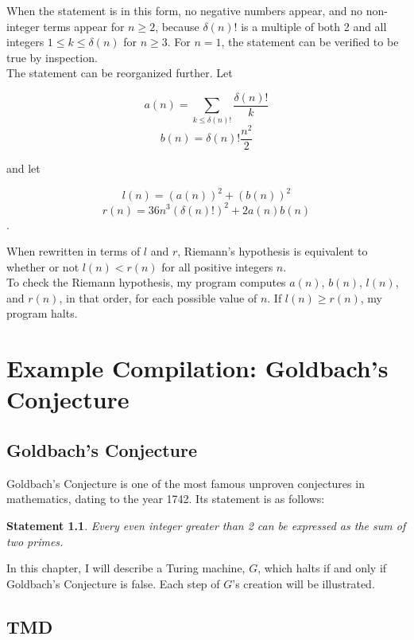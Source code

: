 \documentclass[11pt]{report}
\newtheorem{statement}{Statement}
\begin{document}
When the statement is in this form, no negative numbers appear, and no non-integer terms appear for $n \ge 2$, because $\delta(n)!$ is a multiple of both 2 and all integers $1 \le k \le \delta(n)$ for $n \ge 3$. For $n = 1$, the statement can be verified to be true by inspection. \\

The statement can be reorganized further. Let 

$$a(n) = \sum_{k \le \delta(n)!} \frac{\delta(n)!}{k}$$
$$b(n) = \delta(n)!\frac{n^2}{2}$$

and let

$$l(n) = (a(n))^2 + (b(n))^2$$
$$r(n) = 36n^3(\delta(n)!)^2 + 2a(n)b(n)$$.

When rewritten in terms of $l$ and $r$, Riemann's hypothesis is equivalent to whether or not $l(n) < r(n)$ for all positive integers $n$. \\

To check the Riemann hypothesis, my program computes $a(n)$, $b(n)$, $l(n)$, and $r(n)$, in that order, for each possible value of $n$. If $l(n) \ge r(n)$, my program halts.

\chapter{Example Compilation: Goldbach's Conjecture}

\section{Goldbach's Conjecture}

Goldbach's Conjecture is one of the most famous unproven conjectures in mathematics, dating to the year 1742. Its statement is as follows: \\

\begin{statement}
\emph{Every even integer greater than 2 can be expressed as the sum of two primes.}
\label{goldbachstatement}
\end{statement}

In this chapter, I will describe a Turing machine, $G$, which halts if and only if Goldbach's Conjecture is false. Each step of $G$'s creation will be illustrated.

\section{TMD \label{sec:tmdgoldbach}}
\end{document}
